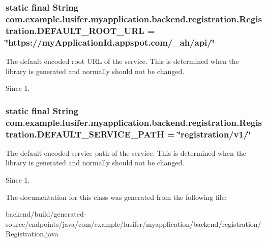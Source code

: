 \subsubsection[{D\+E\+F\+A\+U\+L\+T\+\_\+\+R\+O\+O\+T\+\_\+\+U\+R\+L}]{\setlength{\rightskip}{0pt plus 5cm}static final String com.\+example.\+lusifer.\+myapplication.\+backend.\+registration.\+Registration.\+D\+E\+F\+A\+U\+L\+T\+\_\+\+R\+O\+O\+T\+\_\+\+U\+R\+L = \char`\"{}https\+://my\+Application\+Id.\+appspot.\+com/\+\_\+ah/api/\char`\"{}\hspace{0.3cm}{\ttfamily [static]}}\label{classcom_1_1example_1_1lusifer_1_1myapplication_1_1backend_1_1registration_1_1_registration_a0eef521b9ac939d3cdcd6246bb7d3cff}
The default encoded root U\+R\+L of the service. This is determined when the library is generated and normally should not be changed.

\begin{DoxySince}{Since}
1. 
\end{DoxySince}
\hypertarget{classcom_1_1example_1_1lusifer_1_1myapplication_1_1backend_1_1registration_1_1_registration_a0be92fb550e3ee158bba14a7baaa120f}{}
\subsubsection[{D\+E\+F\+A\+U\+L\+T\+\_\+\+S\+E\+R\+V\+I\+C\+E\+\_\+\+P\+A\+T\+H}]{\setlength{\rightskip}{0pt plus 5cm}static final String com.\+example.\+lusifer.\+myapplication.\+backend.\+registration.\+Registration.\+D\+E\+F\+A\+U\+L\+T\+\_\+\+S\+E\+R\+V\+I\+C\+E\+\_\+\+P\+A\+T\+H = \char`\"{}registration/v1/\char`\"{}\hspace{0.3cm}{\ttfamily [static]}}\label{classcom_1_1example_1_1lusifer_1_1myapplication_1_1backend_1_1registration_1_1_registration_a0be92fb550e3ee158bba14a7baaa120f}
The default encoded service path of the service. This is determined when the library is generated and normally should not be changed.

\begin{DoxySince}{Since}
1. 
\end{DoxySince}


The documentation for this class was generated from the following file\+:\begin{DoxyCompactItemize}
\item 
backend/build/generated-\/source/endpoints/java/com/example/lusifer/myapplication/backend/registration/Registration.\+java\end{DoxyCompactItemize}
